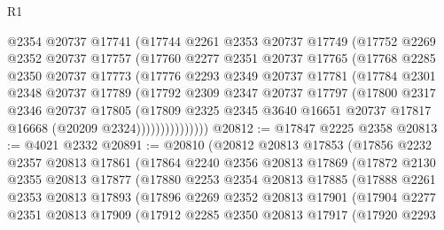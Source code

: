 \begin{lexlean}{R1}
\begin{coremodule}
              @2354
              @20737
              @17741
              (@17744
                @2261
                @2353
                @20737
                @17749
                (@17752
                  @2269
                  @2352
                  @20737
                  @17757
                  (@17760
                    @2277
                    @2351
                    @20737
                    @17765
                    (@17768
                      @2285
                      @2350
                      @20737
                      @17773
                      (@17776
                        @2293
                        @2349
                        @20737
                        @17781
                        (@17784
                          @2301
                          @2348
                          @20737
                          @17789
                          (@17792
                            @2309
                            @2347
                            @20737
                            @17797
                            (@17800
                              @2317
                              @2346
                              @20737
                              @17805
                              (@17809
                                @2325
                                @2345
                                @3640
                                @16651
                                @20737
                                @17817
                                @16668
                                (@20209 @2324)))))))))))))))
@20812 := @17847 @2225 @2358
@20813 := @4021 @2332
@20891 := @20810
    (@20812
      @20813
      @17853
      (@17856
        @2232
        @2357
        @20813
        @17861
        (@17864
          @2240
          @2356
          @20813
          @17869
          (@17872
            @2130
            @2355
            @20813
            @17877
            (@17880
              @2253
              @2354
              @20813
              @17885
              (@17888
                @2261
                @2353
                @20813
                @17893
                (@17896
                  @2269
                  @2352
                  @20813
                  @17901
                  (@17904
                    @2277
                    @2351
                    @20813
                    @17909
                    (@17912
                      @2285
                      @2350
                      @20813
                      @17917
                      (@17920
                        @2293

\end{coremodule}
\end{lexlean}
